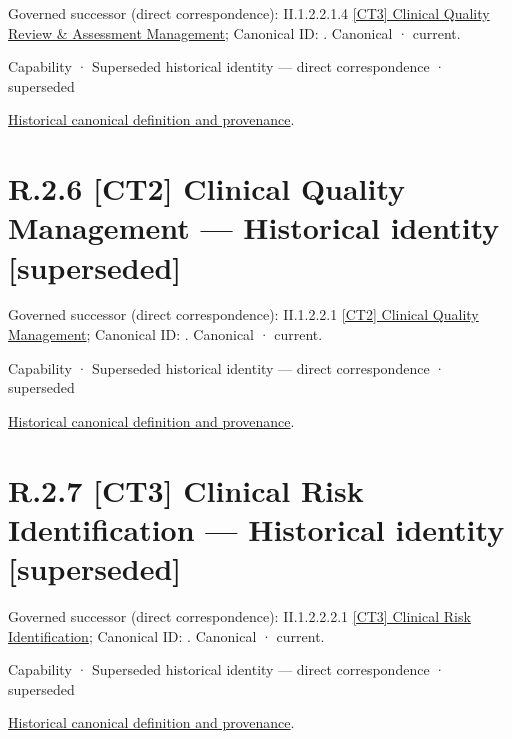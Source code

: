 {\small Governed successor (direct correspondence): II.1.2.2.1.4 \hyperref[element:8318c35b302b4dcaa0e795fbfdc93e3b]{[CT3] Clinical Quality Review \& Assessment Management}; Canonical ID: \texttt{}. Canonical · current.}\par
\label{element:4b17ec92f0af4c4b9556912dbdd0f29f}
{\small Capability · Superseded historical identity — direct correspondence · superseded}\par
\href{../../../../continuum/strategy/capability/4b17ec92f0af4c4b9556912dbdd0f29f.md}{Historical canonical definition and provenance}.\par
\section*{R.2.6 [CT2] Clinical Quality Management — Historical identity [superseded]}
\label{navigation:R.2.6}

{\small Governed successor (direct correspondence): II.1.2.2.1 \hyperref[element:89761f2d38f846c39df1df0975964288]{[CT2] Clinical Quality Management}; Canonical ID: \texttt{}. Canonical · current.}\par
\label{element:dc1bece79eb7452e951d03a2ee6dfaa6}
{\small Capability · Superseded historical identity — direct correspondence · superseded}\par
\href{../../../../continuum/strategy/capability/dc1bece79eb7452e951d03a2ee6dfaa6.md}{Historical canonical definition and provenance}.\par
\section*{R.2.7 [CT3] Clinical Risk Identification — Historical identity [superseded]}
\label{navigation:R.2.7}

{\small Governed successor (direct correspondence): II.1.2.2.2.1 \hyperref[element:d54c19c6efaf42af82ad71a4142149d4]{[CT3] Clinical Risk Identification}; Canonical ID: \texttt{}. Canonical · current.}\par
\label{element:690da55f1f5b4c44ba58cf67a717a564}
{\small Capability · Superseded historical identity — direct correspondence · superseded}\par
\href{../../../../continuum/strategy/capability/690da55f1f5b4c44ba58cf67a717a564.md}{Historical canonical definition and provenance}.\par
